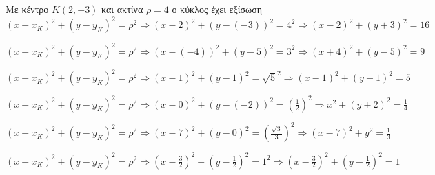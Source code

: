 \begin{alist}
\item Με κέντρο $ K(2,-3) $ και ακτίνα $ \rho=4 $ ο κύκλος έχει εξίσωση
\[ (x-x_K)^2+(y-y_K)^2=\rho^2\Rightarrow (x-2)^2+(y-(-3))^2=4^2\Rightarrow (x-2)^2+(y+3)^2=16 \]
\item $ (x-x_K)^2+(y-y_K)^2=\rho^2\Rightarrow (x-(-4))^2+(y-5)^2=3^2\Rightarrow (x+4)^2+(y-5)^2=9 $
\item $ (x-x_K)^2+(y-y_K)^2=\rho^2\Rightarrow (x-1)^2+(y-1)^2=\sqrt{5}^2\Rightarrow (x-1)^2+(y-1)^2=5 $
\item $ (x-x_K)^2+(y-y_K)^2=\rho^2\Rightarrow (x-0)^2+(y-(-2))^2=\left(\frac{1}{2}\right)^2\Rightarrow x^2+(y+2)^2=\frac{1}{4} $
\item $ (x-x_K)^2+(y-y_K)^2=\rho^2\Rightarrow (x-7)^2+(y-0)^2=\left(\frac{\sqrt{3}}{3}\right)^2\Rightarrow (x-7)^2+y^2=\frac{1}{3} $
\item $ (x-x_K)^2+(y-y_K)^2=\rho^2\Rightarrow \left(x-\frac{3}{2}\right)^2+\left(y-\frac{1}{2}\right)^2=1^2\Rightarrow \left(x-\frac{3}{2}\right)^2+\left(y-\frac{1}{2}\right)^2=1 $
\end{alist}
